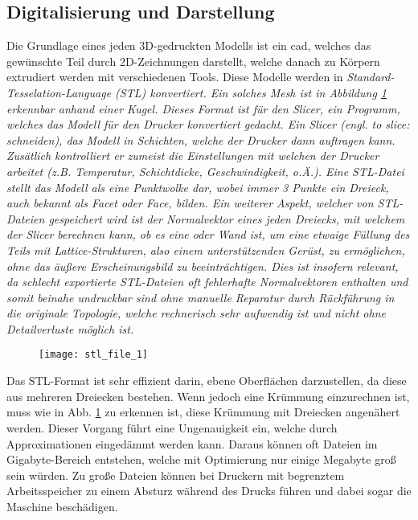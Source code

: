 \documentclass[../main.tex]{subfiles}
\begin{document}
\subsection{Digitalisierung und Darstellung}
Die Grundlage eines jeden 3D-gedruckten Modells ist ein \acrfull{cad}, welches das gewünschte Teil durch 2D-Zeichnungen darstellt, welche danach zu Körpern extrudiert werden mit verschiedenen Tools. Diese Modelle werden  in \it{Standard-Tesselation-Language} (STL) konvertiert. Ein solches \it{Mesh} ist in Abbildung \ref{img:stl_1} erkennbar anhand einer Kugel. Dieses Format ist für den \it{Slicer}, ein Programm, welches das Modell für den Drucker konvertiert gedacht. Ein Slicer (engl. \it{to slice}: schneiden),  das Modell in Schichten, welche der Drucker dann auftragen kann. Zusätlich kontrolliert er zumeist die Einstellungen mit welchen der Drucker arbeitet (z.B. Temperatur, Schichtdicke, Geschwindigkeit, o.Ä.). Eine STL-Datei stellt das Modell als eine Punktwolke dar, wobei immer 3 Punkte ein Dreieck, auch bekannt als \it{Facet} oder \it{Face}, bilden. Ein weiterer Aspekt, welcher von STL-Dateien gespeichert wird ist der Normalvektor eines jeden Dreiecks, mit welchem der Slicer berechnen kann, ob es eine  oder  Wand ist, um eine etwaige Füllung des Teils mit \it{Lattice}-Strukturen, also einem unterstützenden Gerüst, zu ermöglichen, ohne das äußere Erscheinungsbild zu beeinträchtigen. Dies ist insofern relevant, da schlecht exportierte STL-Dateien oft fehlerhafte Normalvektoren enthalten und somit beinahe undruckbar sind ohne manuelle Reparatur durch Rückführung in die originale Topologie, welche rechnerisch sehr aufwendig ist und nicht ohne Detailverluste möglich ist.
\begin{figure}[h]
\begin{center}
	\texttt{[image: stl\_file\_1]}
	\label{img:stl_1}
\end{center}
\end{figure}	
Das STL-Format ist sehr effizient darin, ebene Oberflächen darzustellen, da diese aus mehreren Dreiecken bestehen. Wenn jedoch eine Krümmung einzurechnen ist, muss wie in Abb. \ref{img:stl_1} zu erkennen ist, diese Krümmung mit Dreiecken angenähert werden. Dieser Vorgang führt eine Ungenauigkeit ein, welche durch Approximationen eingedämmt werden kann. Daraus können oft Dateien im Gigabyte-Bereich entstehen, welche mit Optimierung nur einige Megabyte groß sein würden. Zu große Dateien können bei Druckern mit begrenztem Arbeitsspeicher zu einem Absturz während des Drucks führen und dabei sogar die Maschine beschädigen. \parencite{stl_1} 
\end{document}
